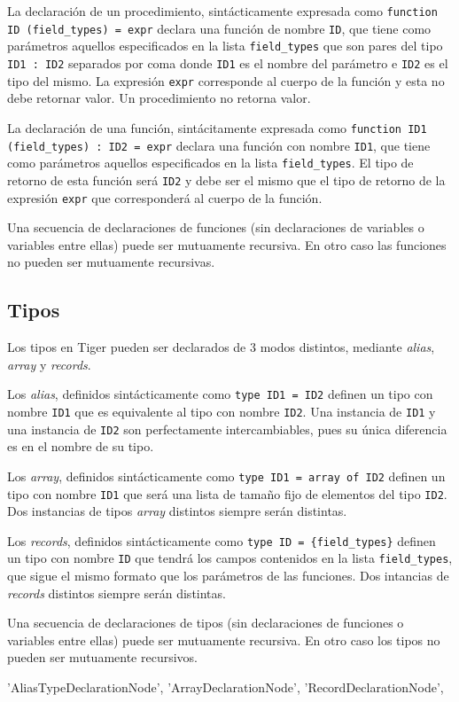 \documentclass{article}
\begin{document}
La declaración de un procedimiento, sintácticamente expresada como
\verb|function ID (field_types) = expr| declara una función de nombre
\verb|ID|, que tiene como parámetros aquellos especificados en la lista
\verb|field_types| que son pares del tipo \verb|ID1 : ID2| separados por
coma donde \verb|ID1| es el nombre del parámetro e \verb|ID2| es el tipo del
mismo. La expresión \verb|expr| corresponde al cuerpo de la función y esta no
debe retornar valor. Un procedimiento no retorna valor.

La declaración de una función, sintácitamente expresada como 
\verb|function ID1 (field_types) : ID2 = expr| declara una función con nombre
\verb|ID1|, que tiene como parámetros aquellos especificados en la lista
\verb|field_types|. El tipo de retorno de esta función será \verb|ID2| y debe
ser el mismo que el tipo de retorno de la expresión \verb|expr| que
corresponderá al cuerpo de la función.

Una secuencia de declaraciones de funciones (sin declaraciones de variables o
variables entre ellas) puede ser mutuamente recursiva. En otro caso las
funciones no pueden ser mutuamente recursivas.

\subsection{Tipos}

Los tipos en Tiger pueden ser declarados de 3 modos distintos, mediante
\emph{alias}, \emph{array} y \emph{records}.

Los \emph{alias}, definidos sintácticamente como \verb|type ID1 = ID2| definen
un tipo con nombre \verb|ID1| que es equivalente al tipo con nombre \verb|ID2|.
Una instancia de \verb|ID1| y una instancia de \verb|ID2| son perfectamente
intercambiables, pues su única diferencia es en el nombre de su tipo.

Los \emph{array}, definidos sintácticamente como \verb|type ID1 = array of ID2|
definen un tipo con nombre \verb|ID1| que será una lista de tamaño fijo de
elementos del tipo \verb|ID2|. Dos instancias de tipos \emph{array} distintos
siempre serán distintas.

Los \emph{records}, definidos sintácticamente como \verb|type ID = {field_types}|
definen un tipo con nombre \verb|ID| que tendrá los campos contenidos en la
lista \verb|field_types|, que sigue el mismo formato que los parámetros de las
funciones. Dos intancias de \emph{records} distintos siempre serán distintas.

Una secuencia de declaraciones de tipos (sin declaraciones de funciones o
variables entre ellas) puede ser mutuamente recursiva. En otro caso los tipos
no pueden ser mutuamente recursivos.



 'AliasTypeDeclarationNode',
    'ArrayDeclarationNode',
    'RecordDeclarationNode',
    
 
\end{document}
